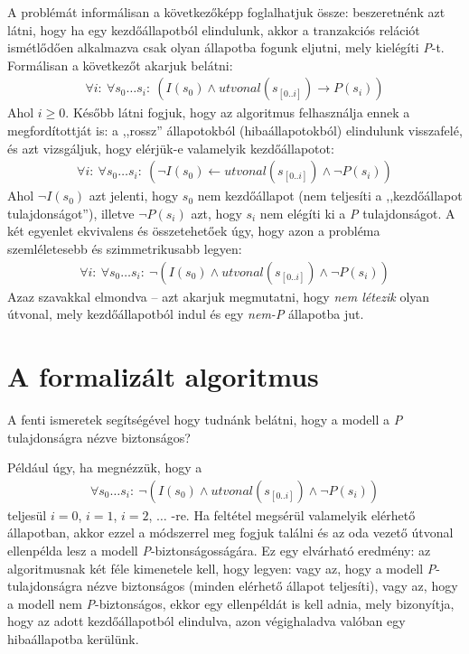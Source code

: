 A problémát informálisan a következőképp foglalhatjuk össze: beszeretnénk azt látni, hogy ha egy kezdőállapotból elindulunk, akkor a tranzakciós relációt ismétlődően alkalmazva csak olyan állapotba fogunk eljutni, mely kielégíti \emph{P}-t. Formálisan a következőt akarjuk belátni:
\begin{align}
	\forall i:~\forall s_{0} \dots s_{i}:~(I(s_{0}) \wedge utvonal(s_{[0..i]}) \rightarrow P(s_{i}))
\end{align}
Ahol $i \geq 0$. Később látni fogjuk, hogy az algoritmus felhasználja ennek a megfordítottját is: a ,,rossz'' állapotokból (hibaállapotokból) elindulunk visszafelé, és azt vizsgáljuk, hogy elérjük-e valamelyik kezdőállapotot:
\begin{align}
	\forall i:~\forall s_{0} \dots s_{i}:~(\neg I(s_{0}) \leftarrow utvonal(s_{[0..i]}) \wedge \neg P(s_{i}))
\end{align}
Ahol $\neg I(s_{0})$ azt jelenti, hogy $s_{0}$ nem kezdőállapot (nem teljesíti a ,,kezdőállapot tulajdonságot''), illetve $\neg P(s_{i})$ azt, hogy $s_{i}$ nem elégíti ki a \emph{P} tulajdonságot. A két egyenlet ekvivalens és összetehetőek úgy, hogy azon a probléma szemléletesebb és szimmetrikusabb legyen:
\begin{align}
	\forall i:~\forall s_{0} \dots s_{i}:~\neg(I(s_{0}) \wedge utvonal(s_{[0..i]}) \wedge \neg P(s_{i}))
\end{align}
Azaz szavakkal elmondva -- azt akarjuk megmutatni, hogy \emph{nem létezik} olyan útvonal, mely kezdőállapotból indul és egy \emph{nem-P} állapotba jut.

\section{A formalizált algoritmus}

A fenti ismeretek segítségével hogy tudnánk belátni, hogy a modell a \emph{P} tulajdonságra nézve biztonságos?

Például úgy, ha megnézzük, hogy a 
\begin{align}
	\forall s_{0} \dots s_{i}:~\neg(I(s_{0}) \wedge utvonal(s_{[0..i]}) \wedge \neg P(s_{i}))
\end{align}
teljesül $i = 0$, $i = 1$, $i = 2$, $\dots$ -re. Ha feltétel megsérül valamelyik elérhető állapotban, akkor ezzel a módszerrel meg fogjuk találni és az oda vezető útvonal ellenpélda lesz a modell \emph{P}-biztonságosságára. Ez egy elvárható eredmény: az algoritmusnak két féle kimenetele kell, hogy legyen: vagy az, hogy a modell \emph{P}-tulajdonságra nézve biztonságos (minden elérhető állapot teljesíti), vagy az, hogy a modell nem \emph{P}-biztonságos, ekkor egy ellenpéldát is kell adnia, mely bizonyítja, hogy az adott kezdőállapotból elindulva, azon végighaladva valóban egy hibaállapotba kerülünk.

